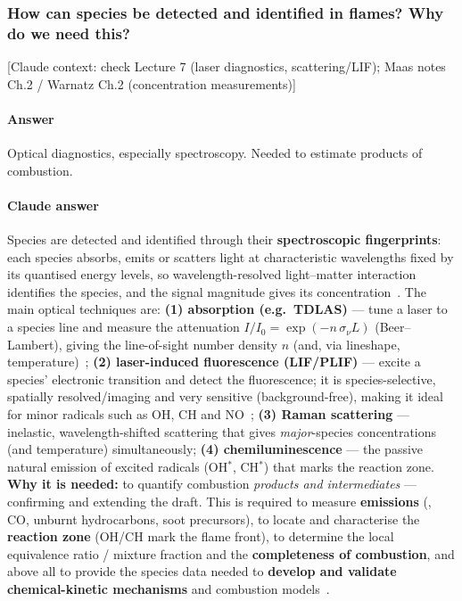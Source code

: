 \subsubsection{How can species be detected and identified in flames? Why do we need this?}

{\color{gray}\footnotesize [Claude context: check Lecture 7 (laser diagnostics, scattering/LIF); Maas notes Ch.2 / Warnatz Ch.2 (concentration measurements)]}

\paragraph{Answer}

Optical diagnostics, especially spectroscopy. Needed to estimate products of combustion.

{\color{istblue}
\paragraph{Claude answer}
Species are detected and identified through their \textbf{spectroscopic fingerprints}: each species absorbs, emits or scatters light at characteristic wavelengths fixed by its quantised energy levels, so wavelength-resolved light--matter interaction identifies the species, and the signal magnitude gives its concentration~\cite{lecture7,warnatz2006combustion}. The main optical techniques are: \textbf{(1) absorption (e.g.\ TDLAS)} --- tune a laser to a species line and measure the attenuation $I/I_0 = \exp(-n\,\sigma_\nu L)$ (Beer--Lambert), giving the line-of-sight number density $n$ (and, via lineshape, temperature)~\cite{lecture7,hitran}; \textbf{(2) laser-induced fluorescence (LIF/PLIF)} --- excite a species' electronic transition and detect the fluorescence; it is species-selective, spatially resolved/imaging and very sensitive (background-free), making it ideal for minor radicals such as OH, CH and NO~\cite{lecture7,crosley1983}; \textbf{(3) Raman scattering} --- inelastic, wavelength-shifted scattering that gives \emph{major}-species concentrations (and temperature) simultaneously; \textbf{(4) chemiluminescence} --- the passive natural emission of excited radicals (OH$^*$, CH$^*$) that marks the reaction zone. \textbf{Why it is needed:} to quantify combustion \emph{products and intermediates} --- confirming and extending the draft. This is required to measure \textbf{emissions} (, CO, unburnt hydrocarbons, soot precursors), to locate and characterise the \textbf{reaction zone} (OH/CH mark the flame front), to determine the local equivalence ratio / mixture fraction and the \textbf{completeness of combustion}, and above all to provide the species data needed to \textbf{develop and validate chemical-kinetic mechanisms} and combustion models~\cite{lecture7,warnatz2006combustion,crosley1983}.
}




